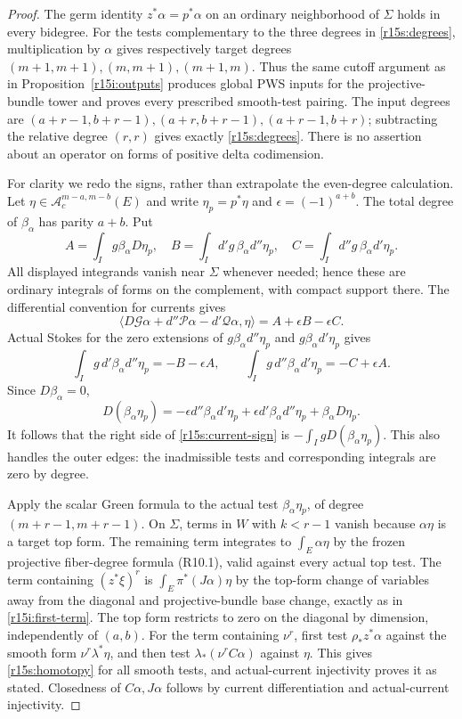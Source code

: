 \begin{proof}
The germ identity $z^*\alpha=p^*\alpha$ on an ordinary
neighborhood of $\Sigma$ holds in every bidegree.  For the
tests complementary to the three degrees in
\eqref{r15s:degrees}, multiplication by $\alpha$ gives
respectively target degrees $(m+1,m+1),(m,m+1),(m+1,m)$.
Thus the same cutoff argument as in
Proposition~\ref{r15i:outputs} produces global PWS inputs
for the projective-bundle tower and proves every prescribed
smooth-test pairing.  The input degrees are
$(a+r-1,b+r-1),(a+r,b+r-1),(a+r-1,b+r)$;
subtracting the relative degree $(r,r)$ gives exactly
\eqref{r15s:degrees}.  There is no assertion about an
operator on forms of positive delta codimension.

For clarity we redo the signs, rather than extrapolate the
even-degree calculation.  Let
$\eta\in\mathcal A_c^{m-a,m-b}(E)$ and write
$\eta_p=p^*\eta$ and $\epsilon=(-1)^{a+b}$.
The total degree of $\beta_\alpha$ has parity $a+b$.
Put
\[
 A=\int_I g\beta_\alpha D\eta_p,\quad
 B=\int_I d'g\,\beta_\alpha d''\eta_p,\quad
 C=\int_I d''g\,\beta_\alpha d'\eta_p.
\]
All displayed integrands vanish near $\Sigma$ whenever
needed; hence these are ordinary integrals of forms on the
complement, with compact support there.  The differential
convention for currents gives
\[
 \langle D\mathcal G\alpha+d''\mathcal P\alpha
                   -d'\mathcal Q\alpha,\eta\rangle
                       =A+\epsilon B-\epsilon C.
\tag{FS15.4}\label{r15s:current-sign}
\]
Actual Stokes for the zero extensions of
$g\beta_\alpha d''\eta_p$ and
$g\beta_\alpha d'\eta_p$ gives
\[
 \int_I g\,d'\beta_\alpha d''\eta_p=-B-\epsilon A,
 \qquad
 \int_I g\,d''\beta_\alpha d'\eta_p=-C+\epsilon A.
\]
Since $D\beta_\alpha=0$,
\[
 D(\beta_\alpha\eta_p)
   =-\epsilon d''\beta_\alpha d'\eta_p
      +\epsilon d'\beta_\alpha d''\eta_p
      +\beta_\alpha D\eta_p.
\]
It follows that the right side of
\eqref{r15s:current-sign} is
$-\int_IgD(\beta_\alpha\eta_p)$.
This also handles the outer edges: the inadmissible tests
and corresponding integrals are zero by degree.

Apply the scalar Green formula to the actual test
$\beta_\alpha\eta_p$, of degree
$(m+r-1,m+r-1)$.  On $\Sigma$, terms in $W$ with
$k<r-1$ vanish because $\alpha\eta$ is a target top form.
The remaining term integrates to $\int_E\alpha\eta$
by the frozen projective fiber-degree formula (R10.1),
valid against every actual top test.  The term containing
$(z^*\xi)^r$ is $\int_E\pi^*(J\alpha)\eta$ by the
top-form change of variables away from the diagonal and
projective-bundle base change, exactly as in
\eqref{r15i:first-term}.  The top form restricts to zero
on the diagonal by dimension, independently of $(a,b)$.
For the term containing $\nu^r$, first test $\rho_*z^*\alpha$
against the smooth form $\nu^r\lambda^*\eta$, and then
test $\lambda_*(\nu^r C\alpha)$ against $\eta$.
This gives \eqref{r15s:homotopy} for all smooth tests,
and actual-current injectivity proves it as stated.
Closedness of $C\alpha,J\alpha$ follows by current
differentiation and actual-current injectivity.
\end{proof}

